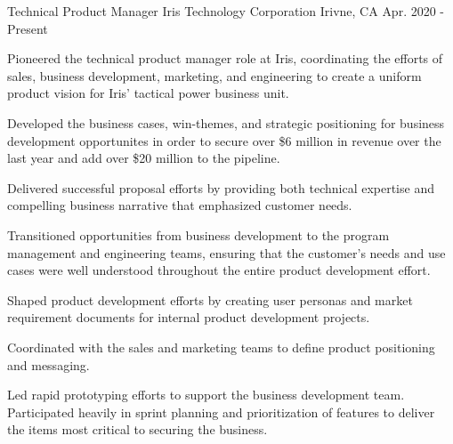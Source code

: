 

\begin{cventries}

  \cventry
    {Technical Product Manager} %
    {Iris Technology Corporation} %
    {Irivne, CA} %
    {Apr. 2020 - Present} %
    {
      \begin{cvitems} %
        \item {Pioneered the technical product manager role at Iris, coordinating the efforts of sales, business development, marketing, and engineering to create a uniform product vision for Iris' tactical power business unit.}
        \item {Developed the business cases, win-themes, and strategic positioning for business development opportunites in order to secure over \$6 million in revenue over the last year and add over \$20 million to the pipeline.}
        \item {Delivered successful proposal efforts by providing both technical expertise and compelling business narrative that emphasized customer needs.}
        \item {Transitioned opportunities from business development to the program management and engineering teams, ensuring that the customer's needs and use cases were well understood throughout the entire product development effort.}
        \item {Shaped product development efforts by creating user personas and market requirement documents for internal product development projects.}
        \item {Coordinated with the sales and marketing teams to define product positioning and messaging.}
        \item {Led rapid prototyping efforts to support the business development team. Participated heavily in sprint planning and prioritization of features to deliver the items most critical to securing the business.}
      \end{cvitems}
    }


\end{cventries}
